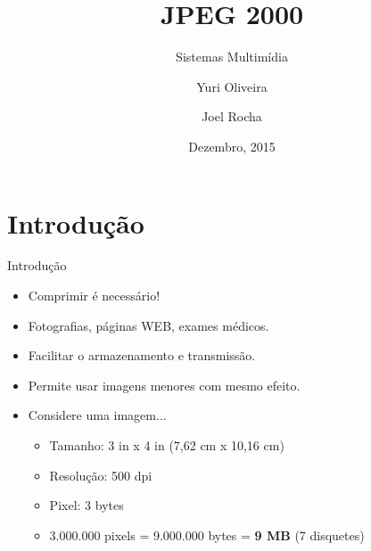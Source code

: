 \documentclass{beamer}
\title{JPEG 2000}
\subtitle{Sistemas Multimídia}
\author[Yuri, Joel]{Yuri Oliveira \and Joel Rocha}
\institute[IFCE]{Instituto Federal de Ciência, Arte e Tecnologia}
\date{Dezembro, 2015}
\begin{document}
\begin{frame}
\titlepage
\end{frame}
\begin{frame}{\contentsname}
\tableofcontents
\end{frame}
\section{Introdução}
\begin{frame}{Introdução}
   \begin{itemize}
      \item Comprimir é necessário!
      \item Fotografias, páginas WEB, exames médicos.
      \item Facilitar o armazenamento e transmissão.
      \item Permite usar imagens menores com mesmo efeito.
      \item Considere uma imagem...
         \begin{itemize}
            \item Tamanho: 3 in x 4 in (7,62 cm x 10,16 cm)
            \item Resolução: 500 dpi
            \item Pixel: 3 bytes
            \item 3.000.000 pixels = 9.000.000 bytes = \textbf{9 MB} (7 disquetes)
         \end{itemize}
   \end{itemize}
\end{frame}
\end{document}
